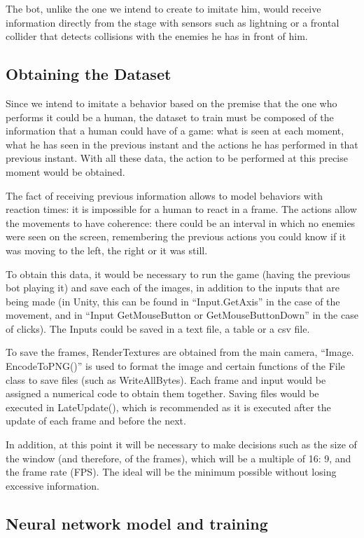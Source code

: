 The bot, unlike the one we intend to create to imitate him, would receive information directly from the stage with sensors such as lightning or a frontal collider that detects collisions with the enemies he has in front of him.

\subsection{Obtaining the Dataset}

Since we intend to imitate a behavior based on the premise that the one who performs it could be a human, the dataset to train must be composed of the information that a human could have of a game: what is seen at each moment, what he has seen in the previous instant and the actions he has performed in that previous instant. With all these data, the action to be performed at this precise moment would be obtained.

The fact of receiving previous information allows to model behaviors with reaction times: it is impossible for a human to react in a frame. The actions allow the movements to have coherence: there could be an interval in which no enemies were seen on the screen, remembering the previous actions you could know if it was moving to the left, the right or it was still.

To obtain this data, it would be necessary to run the game (having the previous bot playing it) and save each of the images, in addition to the inputs that are being made (in Unity, this can be found in “Input.GetAxis” in the case of the movement, and in “Input GetMouseButton or GetMouseButtonDown” in the case of clicks). The Inputs could be saved in a text file, a table or a csv file.

To save the frames, RenderTextures are obtained from the main camera, “Image. EncodeToPNG()” is used to format the image and certain functions of the File class to save files (such as WriteAllBytes). Each frame and input would be assigned a numerical code to obtain them together. Saving files would be executed in LateUpdate(), which is recommended as it is executed after the update of each frame and before the next.

In addition, at this point it will be necessary to make decisions such as the size of the window (and therefore, of the frames), which will be a multiple of 16: 9, and the frame rate (FPS). The ideal will be the minimum possible without losing excessive information.


\subsection{Neural network model and training}


